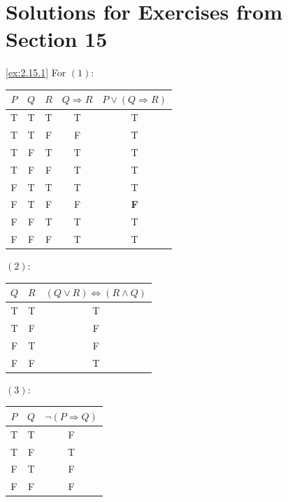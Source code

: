 \section*{Solutions for Exercises from Section 15}
\begin{solution}\label{sol:2.15.1}\ref{ex:2.15.1}
    For $(1)$: 
    \begin{table}[H]
    \centering
    \begin{tabular}{ccccc}
    \toprule
    $P$ & $Q$ & $R$ & $Q \Rightarrow R$ & $P \lor (Q \Rightarrow R)$ \\
    \midrule
    T & T & T & T & T \\
    T & T & F & F & T \\
    T & F & T & T & T \\
    T & F & F & T & T \\
    F & T & T & T & T \\
    F & T & F & F & \textbf{F} \\
    F & F & T & T & T \\
    F & F & F & T & T \\
    \bottomrule
    \end{tabular}
    \end{table}

    $(2)$:
    \begin{table}[H]
        \centering
        \begin{tabular}{ccc}
        \toprule
        $Q$ & $R$ & $(Q\lor R)\Leftrightarrow (R\land Q)$\\
        \midrule
        T & T & T\\
        T & F & F\\
        F & T & F\\
        F & F & T\\
        \bottomrule
        \end{tabular}
    \end{table}    
   
    $(3)$:
    \begin{table}[H]
        \centering
        \begin{tabular}{ccc}
            \toprule
            $P$ & $Q$ & $\neg(P\Rightarrow Q)$\\
            \midrule
            T & T & F \\
            T & F & T \\
            F & T & F \\
            F & F & F\\
            \bottomrule
        \end{tabular}
    \end{table}


\end{solution}
